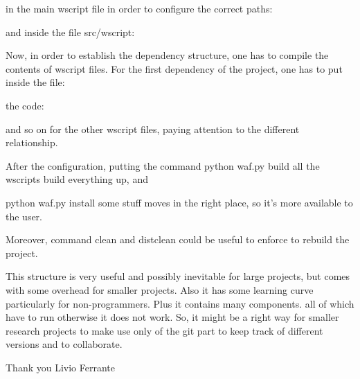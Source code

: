 \documentclass{article}
\begin{document}
in the main wscript file in order to configure the correct paths:

and inside the file src/wscript:

Now, in order to establish the dependency structure, one has to compile the contents of wscript files.
For the first dependency of the project, one has to put inside the file:


the code:

and so on for the other wscript files, paying attention to the different relationship.

After the configuration, putting the command
python waf.py build
all the wscripts build everything up, and

python waf.py install
some stuff moves in the right place, so it's more available to the user.


Moreover, command clean and distclean could be useful to enforce to rebuild the project. 

This structure is very useful and possibly inevitable for large projects, but comes with some overhead for smaller projects. Also it has some learning curve particularly for non-programmers. Plus it contains many components. all of which have to run otherwise it does not work. 
So, it might be a right way for smaller research projects to make use only of the git part to keep track of different versions and to collaborate. 

Thank you
Livio Ferrante
\end{document}
